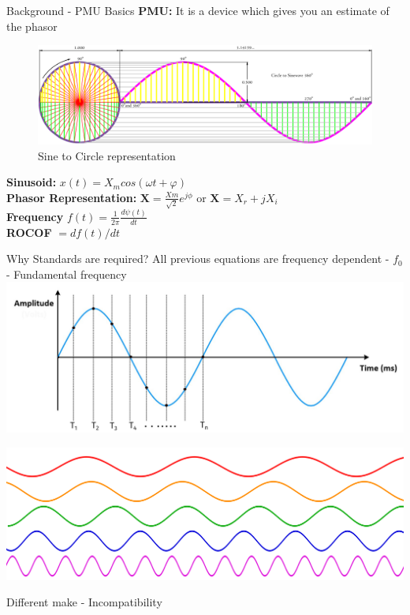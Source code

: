 \documentclass{beamer}
\begin{document}
   \begin{frame}{Background - PMU Basics}
   \textbf{PMU:} It is a device which gives you an estimate of the phasor 
   \begin{figure}
   \includegraphics*[scale = 0.2]{Circle-To-Sine-Wave.png}
   \caption{Sine to Circle representation \cite{site:westau}}
   \end{figure}

   \textbf{Sinusoid:} \textbf{$x(t) = X_m cos(\omega t + \varphi)$} \\
	\textbf{Phasor Representation:} $\textbf{X} = \frac{Xm}{\sqrt{2}}e^{j\phi} $ or $\textbf{X} = X_r+jX_i$ \\
	\textbf{Frequency} $f(t) = \frac{1}{2\pi}\frac{d\psi(t)}{dt}$\\
	\textbf{ROCOF} $= df(t)/dt$
   
   \end{frame}

\begin{frame}{Why Standards are required?}
\centering
All previous equations are frequency dependent - $f_0$ - Fundamental frequency
\includegraphics[scale=0.2]{sine_sampled.png} \\
\pause

\includegraphics[scale=0.1]{multisine.png}

\pause

\hspace{50pt}Different make - Incompatibility 
\end{frame}
   
\end{document}
